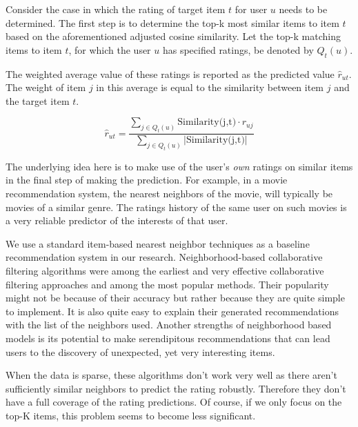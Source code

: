         
        
        Consider the case in which the rating of target item $t$ for user $u$ needs to be determined. The first step is to determine the top-k most similar items to item $t$ based on the aforementioned adjusted cosine similarity. Let the top-k matching items to item $t$, for which the user $u$ has specified ratings, be denoted by $Q_{t}(u)$.

        The weighted average value of these ratings is reported as the predicted value $\hat{r}_{ut}$. The weight of item $j$ in this average is equal to the similarity between item $j$ and the target item $t$. 
        
        \begin{equation}
            \hat{r}_{ut} = \frac{\sum_{j \in Q_{t}(u)} \text{Similarity(j,t)} \cdot r_{uj}}{\sum_{j \in Q_{t}(u)} |\text{Similarity(j,t)}|}
        \end{equation}
        
        The underlying idea here is to make use of the user’s \textit{own} ratings on similar items in the final step of making the prediction. For example, in a movie recommendation system, the nearest neighbors of the movie, will typically be movies of a similar genre. The ratings history of the same user on such movies is a very reliable predictor of the interests of that user.
        
        We use a standard item-based nearest neighbor techniques \cite{desrosiers2011comprehensive} as a baseline recommendation system in our research. Neighborhood-based collaborative filtering algorithms were among the earliest and very effective collaborative filtering approaches and among the most popular methods. Their popularity might not be because of their accuracy but rather because they are quite simple to implement. It is also quite easy to explain their generated recommendations with the list of the neighbors used. Another strengths of neighborhood based models is its potential to make serendipitous recommendations that can lead users to the discovery of unexpected, yet very interesting items.
        
        When the data is sparse, these algorithms don't work very well as there aren't sufficiently similar neighbors to predict the rating robustly. Therefore they don't have a full coverage of the rating predictions. Of course, if we only focus on the top-K items, this problem seems to become less significant.
        
